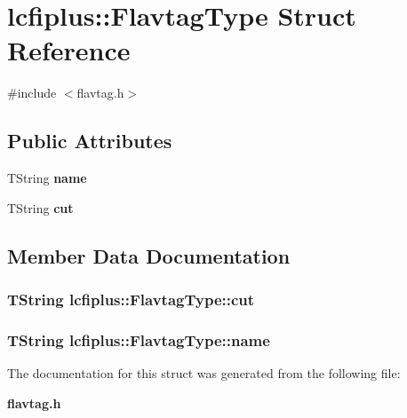 \section{lcfiplus\-:\-:Flavtag\-Type Struct Reference}
\label{structlcfiplus_1_1FlavtagType}


{\ttfamily \#include $<$flavtag.\-h$>$}

\subsection*{Public Attributes}
\begin{DoxyCompactItemize}
\item 
T\-String {\bf name}
\item 
T\-String {\bf cut}
\end{DoxyCompactItemize}


\subsection{Member Data Documentation}
\subsubsection[{cut}]{\setlength{\rightskip}{0pt plus 5cm}T\-String lcfiplus\-::\-Flavtag\-Type\-::cut}\label{structlcfiplus_1_1FlavtagType_a5f9e0f11aacc3b9ef1fdce68fe2ffda3}
\subsubsection[{name}]{\setlength{\rightskip}{0pt plus 5cm}T\-String lcfiplus\-::\-Flavtag\-Type\-::name}\label{structlcfiplus_1_1FlavtagType_a41acddbb497954e875416c16648c0b08}


The documentation for this struct was generated from the following file\-:\begin{DoxyCompactItemize}
\item 
{\bf flavtag.\-h}\end{DoxyCompactItemize}
